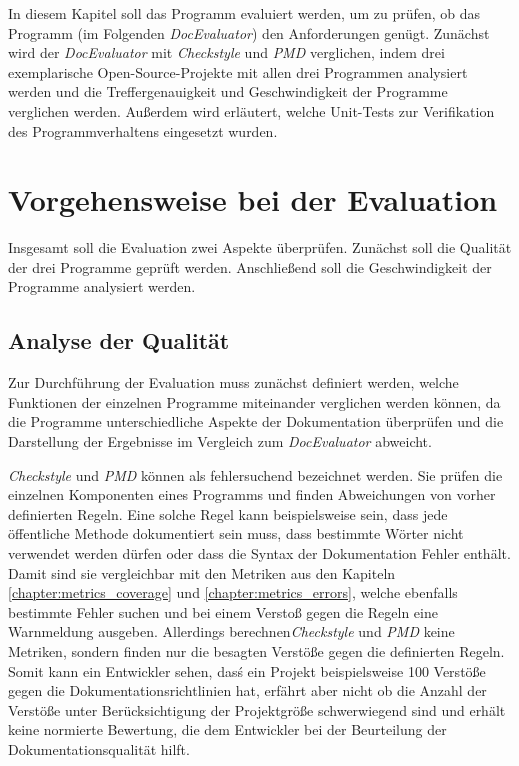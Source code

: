 \newcommand{\checkpmd}{\textit{Checkstyle} und \textit{PMD} }
\newcommand{\doceval}{\textit{DocEvaluator} }
In diesem Kapitel soll das Programm evaluiert werden, um zu prüfen, ob das Programm (im Folgenden \textit{DocEvaluator}) den Anforderungen genügt.  Zunächst wird der \textit{DocEvaluator} mit \checkpmd{} verglichen, indem drei exemplarische Open-Source-Projekte mit allen drei Programmen analysiert werden und die Treffergenauigkeit und Geschwindigkeit der Programme verglichen werden. Außerdem wird  erläutert, welche Unit-Tests zur Verifikation des Programmverhaltens eingesetzt wurden.
\section{Vorgehensweise bei der Evaluation}
Insgesamt soll die Evaluation zwei Aspekte überprüfen. Zunächst soll die Qualität der drei Programme geprüft werden. Anschließend soll die Geschwindigkeit der Programme analysiert werden.

\subsection{Analyse der Qualität}
Zur Durchführung der Evaluation muss zunächst definiert werden, welche Funktionen der einzelnen Programme miteinander verglichen werden können, da die Programme unterschiedliche Aspekte der Dokumentation überprüfen und die Darstellung der Ergebnisse im Vergleich zum \textit{DocEvaluator} abweicht.

\checkpmd können als fehlersuchend bezeichnet werden. Sie prüfen die einzelnen Komponenten eines Programms und finden Abweichungen von vorher definierten Regeln. Eine solche Regel kann beispielsweise sein, dass jede öffentliche Methode dokumentiert sein muss, dass bestimmte Wörter nicht verwendet werden dürfen oder dass die Syntax der Dokumentation Fehler enthält. Damit sind sie vergleichbar mit den Metriken aus den Kapiteln \ref{chapter:metrics_coverage}  und \ref{chapter:metrics_errors}, welche ebenfalls bestimmte Fehler suchen und bei einem Verstoß gegen die Regeln eine Warnmeldung ausgeben. Allerdings berechnen\checkpmd keine Metriken, sondern finden nur die besagten Verstöße gegen die definierten Regeln. Somit kann ein Entwickler sehen, dasś ein Projekt beispielsweise 100 Verstöße gegen die Dokumentationsrichtlinien hat, erfährt aber nicht ob die Anzahl der Verstöße unter Berücksichtigung der Projektgröße schwerwiegend sind und erhält keine normierte Bewertung, die dem Entwickler bei der Beurteilung der Dokumentationsqualität hilft. 

